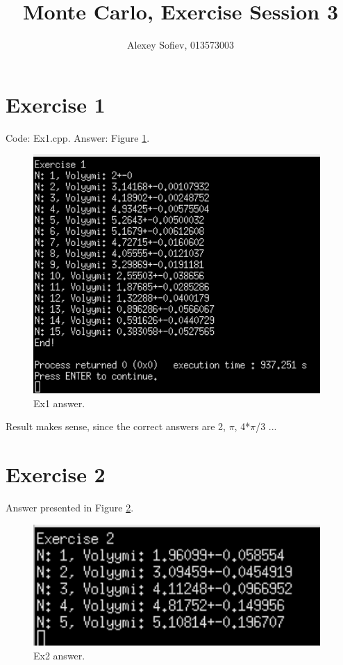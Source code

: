 \documentclass{article}
\begin{document}
\title{Monte Carlo, Exercise Session 3}
\author{Alexey Sofiev, 013573003}

\maketitle


\section{Exercise 1}
Code: Ex1.cpp. Answer: Figure \ref{fig:ex1_answer}.

\begin{figure}[!hbt]
    \centering
    \includegraphics[width=4.3in]{ex1_answer}
    \caption{Ex1 answer.}
    \label{fig:ex1_answer}
\end{figure}

	Result makes sense, since the correct answers are 2, $\pi$, 4*$\pi$/3 ...

\clearpage

\section{Exercise 2}
Answer presented in Figure \ref{fig:ex2_answer}.
\begin{figure}[!hbt]
	\centering
	\includegraphics[width=4.3in]{ex2_answer}
	\caption{Ex2 answer.}
	\label{fig:ex2_answer}
\end{figure}
\end{document}
